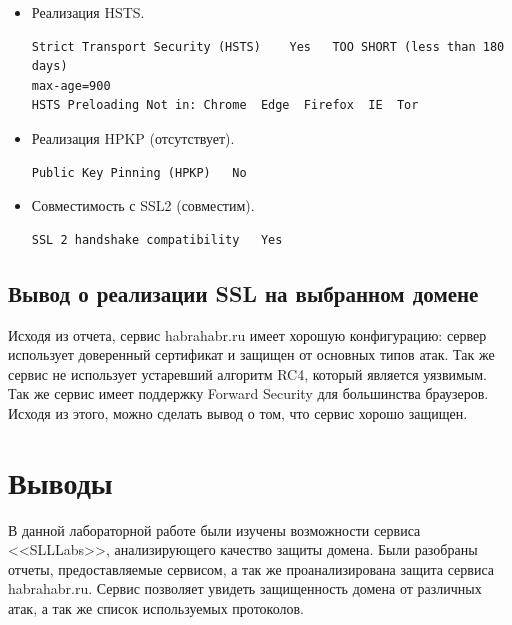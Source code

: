 \documentclass[10pt,a4paper]{report}
\begin{document}
\begin{itemize}
				\item Реализация HSTS.
				\begin{lstlisting}
Strict Transport Security (HSTS)	Yes   TOO SHORT (less than 180 days) 
max-age=900
HSTS Preloading	Not in: Chrome  Edge  Firefox  IE  Tor
				\end{lstlisting}
				
				\item Реализация HPKP (отсутствует).
				\begin{lstlisting}
Public Key Pinning (HPKP)	No
				\end{lstlisting}
				
				\item Совместимость с SSL2 (совместим).
				\begin{lstlisting}
SSL 2 handshake compatibility	Yes
				\end{lstlisting}
			\end{itemize}
		
		\subsection{Вывод о реализации SSL на выбранном домене}
			Исходя из отчета, сервис habrahabr.ru имеет хорошую конфигурацию: сервер 
			использует доверенный сертификат и защищен от основных типов атак.
			Так же сервис не использует устаревший алгоритм RC4, который является 
			уязвимым.
			Так же сервис имеет поддержку Forward Security для большинства браузеров.
			Исходя из этого, можно сделать вывод о том, что сервис хорошо защищен.
	
	\section{Выводы}
		В данной лабораторной работе были изучены возможности сервиса <<SLLLabs>>, 
		анализирующего качество защиты домена.
		Были разобраны отчеты, предоставляемые сервисом, а так же проанализирована 
		защита сервиса habrahabr.ru.
		Сервис позволяет увидеть защищенность домена от различных атак, а так же 
		список используемых протоколов.
\end{document}
